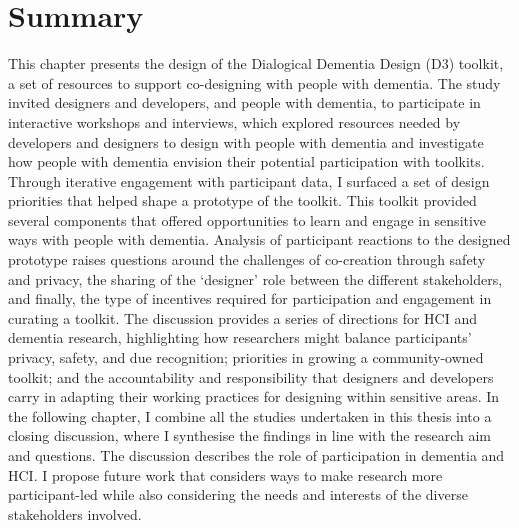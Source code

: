 \section{Summary}
\label{D3:Summary}
This chapter presents the design of the Dialogical Dementia Design (D3) toolkit, a set of resources to support co-designing with people with dementia. The study invited designers and developers, and people with dementia, to participate in interactive workshops and interviews, which explored resources needed by developers and designers to design with people with dementia and investigate how people with dementia envision their potential participation with toolkits. Through iterative engagement with participant data, I surfaced a set of design priorities that helped shape a prototype of the toolkit. This toolkit provided several components that offered opportunities to learn and engage in sensitive ways with people with dementia. Analysis of participant reactions to the designed prototype raises questions around the challenges of co-creation through safety and privacy, the sharing of the ‘designer’ role between the different stakeholders, and finally, the type of incentives required for participation and engagement in curating a toolkit. The discussion provides a series of directions for HCI and dementia research, highlighting how researchers might balance participants' privacy, safety, and due recognition; priorities in growing a community-owned toolkit; and the accountability and responsibility that designers and developers carry in adapting their working practices for designing within sensitive areas. In the following chapter, I combine all the studies undertaken in this thesis into a closing discussion, where I synthesise the findings in line with the research aim and questions. The discussion describes the role of participation in dementia and HCI. I propose future work that considers ways to make research more participant-led while also considering the needs and interests of the diverse stakeholders involved.
